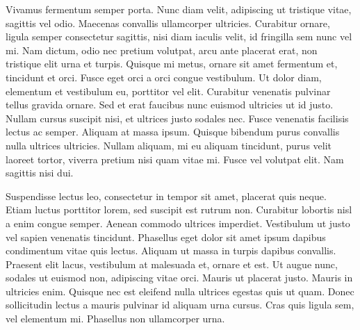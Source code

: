 \documentclass{article}
\begin{document}
Vivamus fermentum semper porta.
Nunc diam velit, adipiscing ut tristique vitae, sagittis vel odio.
Maecenas convallis ullamcorper ultricies.
Curabitur ornare, ligula semper consectetur sagittis, nisi diam iaculis velit,
id fringilla sem nunc vel mi.
Nam dictum, odio nec pretium volutpat, arcu ante placerat erat, non tristique elit urna et turpis.
Quisque mi metus, ornare sit amet fermentum et, tincidunt et orci.
Fusce eget orci a orci congue vestibulum.
Ut dolor diam, elementum et vestibulum eu, porttitor vel elit.
Curabitur venenatis pulvinar tellus gravida ornare.
Sed et erat faucibus nunc euismod ultricies ut id justo.
Nullam cursus suscipit nisi, et ultrices justo sodales nec.
Fusce venenatis facilisis lectus ac semper.
Aliquam at massa ipsum.
Quisque bibendum purus convallis nulla ultrices ultricies.
Nullam aliquam, mi eu aliquam tincidunt, purus velit laoreet tortor, viverra pretium nisi quam vitae mi.
Fusce vel volutpat elit.
Nam sagittis nisi dui.

Suspendisse lectus leo, consectetur in tempor sit amet, placerat quis neque.
Etiam luctus porttitor lorem, sed suscipit est rutrum non.
Curabitur lobortis nisl a enim congue semper.
Aenean commodo ultrices imperdiet.
Vestibulum ut justo vel sapien venenatis tincidunt.
Phasellus eget dolor sit amet ipsum dapibus condimentum vitae quis lectus.
Aliquam ut massa in turpis dapibus convallis.
Praesent elit lacus, vestibulum at malesuada et, ornare et est.
Ut augue nunc, sodales ut euismod non, adipiscing vitae orci.
Mauris ut placerat justo.
Mauris in ultricies enim.
Quisque nec est eleifend nulla ultrices egestas quis ut quam.
Donec sollicitudin lectus a mauris pulvinar id aliquam urna cursus.
Cras quis ligula sem, vel elementum mi.
Phasellus non ullamcorper urna.
\end{document}
